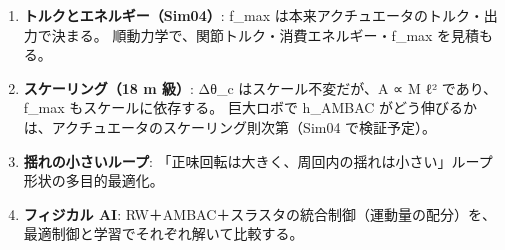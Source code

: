 \begin{enumerate}
\def\labelenumi{\arabic{enumi}.}
\tightlist
\item
  \textbf{トルクとエネルギー（Sim04）}: f\_max は本来アクチュエータのトルク・出力で決まる。 順動力学で、関節トルク・消費エネルギー・f\_max を見積もる。
\item
  \textbf{スケーリング（18 m 級）}: Δθ\_c はスケール不変だが、A ∝ M ℓ² であり、f\_max もスケールに依存する。 巨大ロボで h\_AMBAC がどう伸びるかは、アクチュエータのスケーリング則次第（Sim04 で検証予定）。
\item
  \textbf{揺れの小さいループ}: 「正味回転は大きく、周回内の揺れは小さい」ループ形状の多目的最適化。
\item
  \textbf{フィジカル AI}: RW＋AMBAC＋スラスタの統合制御（運動量の配分）を、最適制御と学習でそれぞれ解いて比較する。
\end{enumerate}
